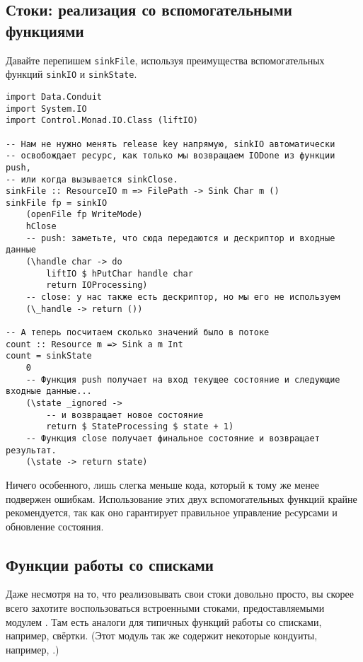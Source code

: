 \subsection{Стоки: реализация со вспомогательными функциями}
Давайте перепишем \lstinline'sinkFile', используя преимущества вспомогательных функций
\lstinline'sinkIO' и \lstinline'sinkState'.
\begin{lstlisting}
import Data.Conduit
import System.IO
import Control.Monad.IO.Class (liftIO)

-- Нам не нужно менять release key напрямую, sinkIO автоматически
-- освобождает ресурс, как только мы возвращаем IODone из функции push,
-- или когда вызывается sinkClose.
sinkFile :: ResourceIO m => FilePath -> Sink Char m ()
sinkFile fp = sinkIO
    (openFile fp WriteMode)
    hClose
    -- push: заметьте, что сюда передаются и дескриптор и входные данные
    (\handle char -> do
        liftIO $ hPutChar handle char
        return IOProcessing)
    -- close: у нас также есть дескриптор, но мы его не используем
    (\_handle -> return ())

-- А теперь посчитаем сколько значений было в потоке
count :: Resource m => Sink a m Int
count = sinkState
    0
    -- Функция push получает на вход текущее состояние и следующие входные данные...
    (\state _ignored ->
        -- и возвращает новое состояние
        return $ StateProcessing $ state + 1)
    -- Функция close получает финальное состояние и возвращает результат.
    (\state -> return state)
\end{lstlisting}
Ничего особенного, лишь слегка меньше кода, который к тому же менее подвержен ошибкам. Использование этих двух
вспомогательных  функций крайне рекомендуется, так как оно гарантирует правильное
управление рeсурсами и обновление состояния.

\subsection{Функции работы со списками}
Даже несмотря на то, что реализовывать свои стоки довольно просто, вы скорее всего захотите воспользоваться встроенными стоками, предоставляемыми модулем
. Там есть аналоги для типичных функций работы со
списками, например, свёртки. (Этот модуль так же содержит некоторые кондуиты,
например,
.)

